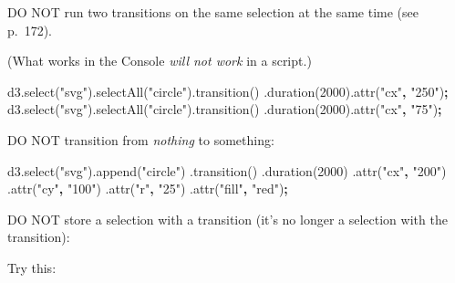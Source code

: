 \documentclass[openany]{book}
\newenvironment{Shaded}{\begin{snugshade}}{\end{snugshade}}
\newcommand{\AttributeTok}[1]{\textcolor[rgb]{0.77,0.63,0.00}{#1}}
\newcommand{\DecValTok}[1]{\textcolor[rgb]{0.00,0.00,0.81}{#1}}
\newcommand{\NormalTok}[1]{#1}
\newcommand{\OperatorTok}[1]{\textcolor[rgb]{0.81,0.36,0.00}{\textbf{#1}}}
\newcommand{\StringTok}[1]{\textcolor[rgb]{0.31,0.60,0.02}{#1}}
\newcommand{\VariableTok}[1]{\textcolor[rgb]{0.00,0.00,0.00}{#1}}
\begin{document}
DO NOT run two transitions on the same selection at the same time (see p.~172).

(What works in the Console \emph{will not work} in a script.)

\begin{Shaded}
\begin{Highlighting}[]
\VariableTok{d3}\NormalTok{.}\AttributeTok{select}\NormalTok{(}\StringTok{"svg"}\NormalTok{).}\AttributeTok{selectAll}\NormalTok{(}\StringTok{"circle"}\NormalTok{).}\AttributeTok{transition}\NormalTok{()}
\NormalTok{    .}\AttributeTok{duration}\NormalTok{(}\DecValTok{2000}\NormalTok{).}\AttributeTok{attr}\NormalTok{(}\StringTok{"cx"}\OperatorTok{,} \StringTok{"250"}\NormalTok{)}\OperatorTok{;}
\VariableTok{d3}\NormalTok{.}\AttributeTok{select}\NormalTok{(}\StringTok{"svg"}\NormalTok{).}\AttributeTok{selectAll}\NormalTok{(}\StringTok{"circle"}\NormalTok{).}\AttributeTok{transition}\NormalTok{()}
\NormalTok{    .}\AttributeTok{duration}\NormalTok{(}\DecValTok{2000}\NormalTok{).}\AttributeTok{attr}\NormalTok{(}\StringTok{"cx"}\OperatorTok{,} \StringTok{"75"}\NormalTok{)}\OperatorTok{;}
\end{Highlighting}
\end{Shaded}

DO NOT transition from \emph{nothing} to something:

\begin{Shaded}
\begin{Highlighting}[]
\VariableTok{d3}\NormalTok{.}\AttributeTok{select}\NormalTok{(}\StringTok{"svg"}\NormalTok{).}\AttributeTok{append}\NormalTok{(}\StringTok{"circle"}\NormalTok{)}
\NormalTok{    .}\AttributeTok{transition}\NormalTok{()}
\NormalTok{    .}\AttributeTok{duration}\NormalTok{(}\DecValTok{2000}\NormalTok{)}
\NormalTok{    .}\AttributeTok{attr}\NormalTok{(}\StringTok{"cx"}\OperatorTok{,} \StringTok{"200"}\NormalTok{)}
\NormalTok{    .}\AttributeTok{attr}\NormalTok{(}\StringTok{"cy"}\OperatorTok{,} \StringTok{"100"}\NormalTok{)}
\NormalTok{    .}\AttributeTok{attr}\NormalTok{(}\StringTok{"r"}\OperatorTok{,} \StringTok{"25"}\NormalTok{)}
\NormalTok{    .}\AttributeTok{attr}\NormalTok{(}\StringTok{"fill"}\OperatorTok{,} \StringTok{"red"}\NormalTok{)}\OperatorTok{;}
\end{Highlighting}
\end{Shaded}

DO NOT store a selection with a transition (it's no longer a selection with the transition):

Try this:
\end{document}
